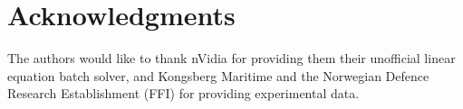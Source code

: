 \documentclass[12pt,journal,captionsoff,onecolumn]{IEEEtran}
\newcounter{todoidx}
\newlength\marginparwidthsmall
\newcommand\todo[1]{%
      \addtocounter{todoidx}{1}%
      {\color{Red}\fbox{\bf\thetodoidx{}}}%
      \marginpar{%
         {\vspace*{-10pt}\color{Red}\fbox{\bf\thetodoidx{}}}\\%
         \fcolorbox{red}{todobackground}{\parbox{\marginparwidthsmall}{\scriptsize #1}}}}
\newcommand\todopar[1]{\fcolorbox{red}{white}{\parbox{0.97\linewidth}{#1}}}
\newcommand\todo[1]{}
\newcommand\1{\vec 1}
\begin{document}


\section*{Acknowledgments}

The authors would like to thank nVidia for providing them their unofficial linear equation batch solver, and Kongsberg Maritime and the Norwegian Defence Research Establishment (FFI) for providing experimental data.
% 
% 
% 
% 
% 
% 
% 
% 
\end{document}
